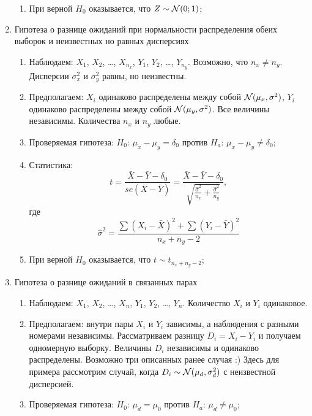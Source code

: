\documentclass[12pt, a4paper]{article}
\begin{document}
\begin{enumerate}[resume]
\begin{enumerate}
    \item При верной $H_0$ оказывается, что $Z \sim \mathcal{N}(0;1)$;
\end{enumerate}


  \item Гипотеза о разнице ожиданий при нормальности распределения обеих выборок и неизвестных но равных дисперсиях
    \begin{enumerate}
      \item Наблюдаем: $X_1$, $X_2$, \ldots, $X_{n_x}$, $Y_1$, $Y_2$, \ldots, $Y_{n_y}$.
	Возможно, что $n_x \neq n_y$. Дисперсии $\sigma^2_x$ и $\sigma^2_y$ равны, но неизвестны.
      \item Предполагаем: $X_i$ одинаково распределены между собой $\mathcal{N}(\mu_x, \sigma^2)$,
	$Y_i$ одинаково распределены между собой $\mathcal{N}(\mu_y, \sigma^2)$.
	Все величины независимы. Количества $n_x$ и $n_y$ любые.
      \item Проверяемая гипотеза: $H_0$: $\mu_x - \mu_y = \delta_0$ против $H_a$: $\mu_x - \mu_y \neq \delta_0$;

     \item Статистика:
	\[
	  t = \frac{\bar X - \bar Y - \delta_0}{se(\bar X - \bar Y)} =
	  \frac{\bar X - \bar Y - \delta_0}{\sqrt{\frac{\hat \sigma^2}{n_x}+\frac{\hat\sigma^2}{n_y}}},
      \]
      где
      \[
	\hat \sigma^2 = \frac{\sum (X_i - \bar X)^2 + \sum (Y_i - \bar Y)^2 }{n_x + n_y - 2}
      \]

    \item При верной $H_0$ оказывается, что $t \sim t_{n_x+n_y-2}$;
\end{enumerate}


  \item Гипотеза о разнице ожиданий в связанных парах
    \begin{enumerate}
      \item Наблюдаем: $X_1$, $X_2$, \ldots, $X_{n}$, $Y_1$, $Y_2$, \ldots, $Y_{n}$.
	Количество $X_i$ и $Y_i$ одинаковое.
      \item Предполагаем: внутри пары $X_i$ и $Y_i$ зависимы, а наблюдения с разными номерами независимы.
	Рассматриваем разницу $D_i = X_i - Y_i$ и получаем одномерную выборку.
	Величины $D_i$ независимы и одинаково распределены.
	Возможно три описанных ранее случая :)
	Здесь для примера рассмотрим случай, когда $D_i \sim \mathcal{N}(\mu_d, \sigma^2_d)$ с неизвестной дисперсией.

      \item Проверяемая гипотеза: $H_0$: $\mu_d = \mu_0$ против $H_a$: $\mu_d \neq \mu_0$;


\end{enumerate}
\end{enumerate}
\end{document}
